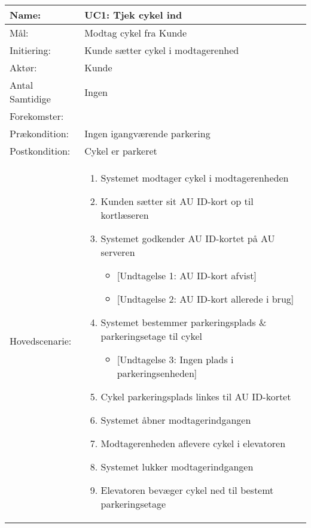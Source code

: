 \documentclass[../main.tex]{subfiles}
\begin{document}
\begin{table}[H]
\begin{tabularx}{\textwidth}{|l|X|}\rowcolor[HTML]{DFDFDF}\hline
    Name:                           & UC1: Tjek cykel ind \\ \hline
    Mål:                            & Modtag cykel fra Kunde  \\\hline \rowcolor[HTML]{DFDFDF}
    Initiering:                     & Kunde sætter cykel i modtagerenhed  \\\hline 
    Aktør:                          & Kunde  \\\hline\rowcolor[HTML]{DFDFDF}
    Antal Samtidige & Ingen \\\rowcolor[HTML]{DFDFDF} Forekomster:    &  \\\hline 
    Prækondition:                   & Ingen igangværende parkering  \\\hline\rowcolor[HTML]{DFDFDF}
    Postkondition:                  & Cykel er parkeret \\\hline 
    Hovedscenarie:                  & 
    \setlist{nolistsep}
    \begin{enumerate}
        \item Systemet modtager cykel i modtagerenheden
        \item Kunden sætter sit AU ID-kort op til kortlæseren
        \item Systemet godkender AU ID-kortet på AU serveren
        \begin{itemize}
            \item {[Undtagelse 1: AU ID-kort afvist]}
            \item {[Undtagelse 2: AU ID-kort allerede i brug]}
        \end{itemize}
        \item Systemet bestemmer parkeringsplads \& parkeringsetage til cykel
        \begin{itemize}
            \item {[Undtagelse 3: Ingen plads i parkeringsenheden]}
        \end{itemize}
        \item Cykel parkeringsplads linkes til AU ID-kortet
        \item Systemet åbner modtagerindgangen
        \item Modtagerenheden aflevere cykel i elevatoren
        \item Systemet lukker modtagerindgangen
        \item Elevatoren bevæger cykel ned til bestemt parkeringsetage

\end{enumerate}
\end{tabularx}
\end{table}
\end{document}
